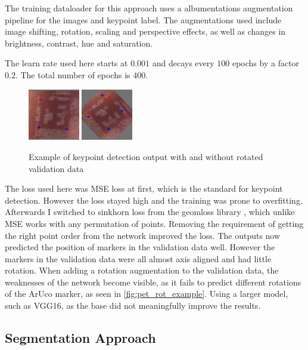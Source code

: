 \documentclass[10pt]{book}
\begin{document}
The training dataloader for this approach uses a albumentations augmentation pipeline for the images and keypoint label. The augmentations used include image shifting, rotation, scaling and perspective effects, as well as changes in brightness, contrast, hue and saturation.

The learn rate used here starts at $0.001$ and decays every $100$ epochs by a factor $0.2$. The total number of epochs is 400.

\begin{figure}
  \centering
     {\includegraphics[width=0.2\textwidth]{image/pet_val_no_rot}}
     {\includegraphics[width=0.2\textwidth]{image/pet_val_rot}}
  \caption{Example of keypoint detection output with and without rotated validation data}
  \label{fig:pet_rot_example}
\end{figure}

The loss used here was \ac{MSE} loss at first, which is the standard for keypoint detection. However the loss stayed high and the training was prone to overfitting. Afterwards I switched to sinkhorn loss from the geomloss library \cite{feydy2019interpolating}, which unlike \ac{MSE} works with any permutation of points. Removing the requirement of getting the right point order from the network improved the loss. The outputs now predicted the position of markers in the validation data well. However the markers in the validation data were all almost axis aligned and had little rotation. When adding a rotation augmentation to the validation data, the weaknesses of the network become visible, as it fails to predict different rotations of the \ac{ArUco} marker, as seen in \autoref{fig:pet_rot_example}. Using a larger model, such as VGG16, as the base did not meaningfully improve the results.

\subsection{Segmentation Approach}
\end{document}

